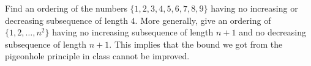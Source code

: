 \documentclass[11pt]{amsart}
\begin{document}
 
\begin{problem}

Find an ordering of the numbers $\{1,2,3,4,5,6,7,8,9\}$ having no increasing or decreasing subsequence of length $4$.  More generally, give an ordering of $\{1,2,\dots,n^2\}$ having no increasing subsequence of length $n+1$ and no decreasing subsequence of length $n+1$.  This implies that the bound we got from the pigeonhole principle in class cannot be improved.
\end{problem}
\begin{solution}
\end{solution}
\end{document}
